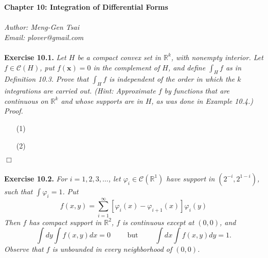 \documentclass{article}
\begin{document}
\textbf{\Large Chapter 10: Integration of Differential Forms} \\\\



\emph{Author: Meng-Gen Tsai} \\
\emph{Email: plover@gmail.com} \\\\









\textbf{Exercise 10.1.}
\emph{Let $H$ be a compact convex set in $\mathbb{R}^k$, with nonempty interior.
Let $f \in \mathscr{C}(H)$, put $f(\mathbf{x}) = 0$ in the complement of $H$,
and define $\int_{H} f$ as in Definition 10.3.
Prove that $\int_{H} f$ is independent of the order in which the $k$ integrations are carried out.
(Hint: Approximate $f$ by functions that are continuous on $\mathbb{R}^k$
and whose supports are in $H$,
as was done in Example 10.4.)} \\



\emph{Proof.}
\begin{enumerate}
\item[(1)]
\item[(2)]

\end{enumerate}
$\Box$ \\\\






\textbf{Exercise 10.2.}
\emph{For $i=1,2,3,\ldots$, let $\varphi_i \in \mathscr{C}(\mathbb{R}^1)$ have support
in $(2^{-i},2^{1-i})$, such that $\int \varphi_i = 1$.
Put
\[
  f(x,y) = \sum_{i=1}^{\infty}[ \varphi_i(x)-\varphi_{i+1}(x) ] \varphi_i(y)
\]
Then $f$ has compact support in $\mathbb{R}^2$,
$f$ is continuous except at $(0,0)$,
and
\[
  \int dy \int f(x,y) dx = 0
  \qquad
  \text{ but }
  \qquad
  \int dx \int f(x,y) dy = 1.
\]
Observe that $f$ is unbounded in every neighborhood of $(0,0)$.} \\
\end{document}
